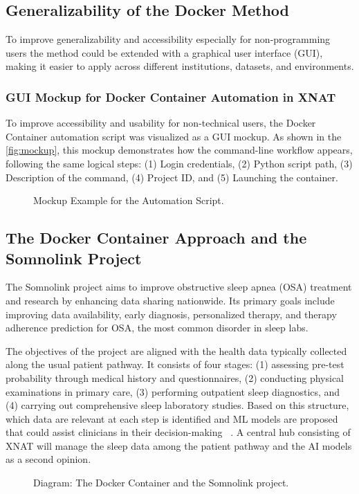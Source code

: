 \subsection{Generalizability of the Docker Method}
To improve generalizability and accessibility especially for non-programming users the method could be extended with a graphical user interface (GUI), making it easier to apply across different institutions, datasets, and environments. 
\normalsize
\subsubsection{GUI Mockup for Docker Container Automation in XNAT}
\normalsize
To improve accessibility and usability for non-technical users, the Docker Container  automation script was visualized as a GUI mockup. As shown in the \autoref{fig:mockup}, this mockup demonstrates how the command-line workflow appears, following the same logical steps: (1) Login credentials, (2) Python script path, (3) Description of the command, (4) Project ID, and (5) Launching the container.
\normalsize
\begin{figure}[H]
    \centering
    \def\svgwidth{\linewidth} 
    
    \caption{ Mockup Example for the Automation Script.}
    \label{fig:mockup}
\end{figure}
\normalsize
\subsection{The Docker Container Approach and the Somnolink Project}

The Somnolink project aims to improve obstructive sleep apnea (OSA) treatment and research by enhancing data sharing nationwide. Its primary goals include improving data availability, early diagnosis, personalized therapy, and therapy adherence prediction for OSA, the most common disorder in sleep labs.

The objectives of the project are aligned with the health data typically collected along the usual patient pathway. It consists of four stages: (1) assessing pre-test probability through medical history and questionnaires, (2) conducting physical examinations in primary care, (3) performing outpatient sleep diagnostics, and (4) carrying out comprehensive sleep laboratory studies. Based on this structure, which data are relevant at each step is identified and ML models are proposed that could assist clinicians in their decision-making ~\cite{krefting_somnolink_2025}. A central hub consisting of XNAT will manage the sleep data among the patient pathway and the AI models as a second opinion.
\begin{figure}[H]
    \centering
    \def\svgwidth{\linewidth} 
    
    \caption{Diagram: The Docker Container and the Somnolink project.}
    \label{fig:somnolink}
\end{figure}

